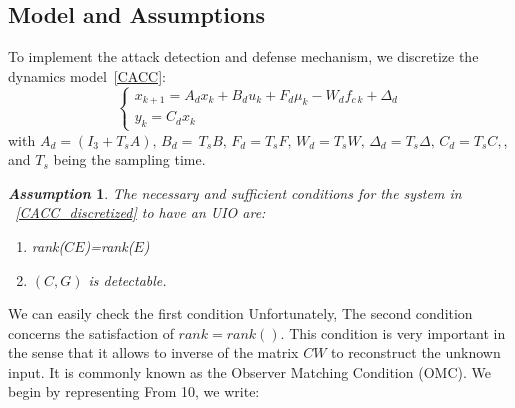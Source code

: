 \documentclass[conference]{IEEEtran}
\newtheorem{assumption}{\it Assumption}%
\begin{document}
\subsection{Model and Assumptions}
To implement the attack detection and defense mechanism, we discretize the dynamics model~\eqref{CACC}: 
\begin{equation}\label{CACC_discretized}
      \left\{ \begin{array}{l}
        x_{k+1} = A_{d}x_{k}+B_{d}u_{k}+F_{d}\mu_{k}-W_{d}f_{c\,k}+\Delta_{d}\\ 
        y_{k} = C_{d}x_{k}
   \end{array}\right.
\end{equation}  
with $A_{d}=(I_{3}+T_{s}A),\,B_{d}=\,T_{s}B,\,F_{d}=T_{s}F,\,W_{d}=T_{s}W,\,\Delta_{d}=T_{s}\Delta,\,C_{d}=T_{s}C,$, and $T_s$ being the sampling time.

\begin{assumption}
The necessary and sufficient conditions for the system in ~\eqref{CACC_discretized} to have an UIO are:
\begin{enumerate}
    \item rank($CE$)=rank($E$)
    \item $(C,G)$ is detectable.
\end{enumerate}

\end{assumption}

We can easily check the first condition
Unfortunately, The second condition concerns the satisfaction of {\color{red}$rank = rank()$}. This condition is very important in the sense that it allows to inverse of the matrix $CW$ to reconstruct the unknown input. It is commonly known as the Observer Matching Condition (OMC).
We begin by representing From 10, we write:
\end{document}
